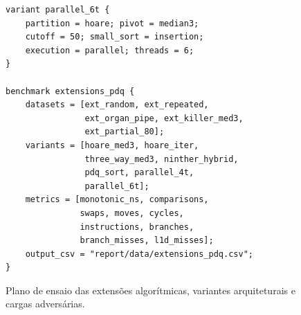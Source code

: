 \documentclass[12pt]{article}
\begin{document}
\begin{figure}[htbp]
\begin{minipage}[t]{0.48\textwidth}
\begin{verbatim}
variant parallel_6t {
	partition = hoare; pivot = median3;
	cutoff = 50; small_sort = insertion;
	execution = parallel; threads = 6;
}

benchmark extensions_pdq {
	datasets = [ext_random, ext_repeated,
	            ext_organ_pipe, ext_killer_med3,
	            ext_partial_80];
	variants = [hoare_med3, hoare_iter,
	            three_way_med3, ninther_hybrid,
	            pdq_sort, parallel_4t,
	            parallel_6t];
	metrics = [monotonic_ns, comparisons,
	           swaps, moves, cycles,
	           instructions, branches,
	           branch_misses, l1d_misses];
	output_csv = "report/data/extensions_pdq.csv";
}
\end{verbatim}
\end{minipage}
\caption{Plano de ensaio das extensões algorítmicas, variantes arquiteturais e cargas adversárias.}
\label{fig:dsl-extensions}
\end{figure}
\end{document}
